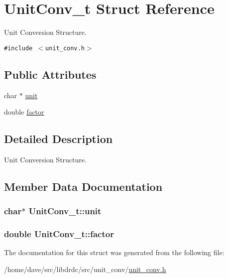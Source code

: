 \hypertarget{structUnitConv__t}{
\section{UnitConv\_\-t Struct Reference}
\label{structUnitConv__t}
}
Unit Conversion Structure.  


{\tt \#include $<$unit\_\-conv.h$>$}

\subsection*{Public Attributes}
\begin{CompactItemize}
\item 
char $\ast$ \hyperlink{structUnitConv__t_d7dea2480635b6ec33a00eada925a162}{unit}
\item 
double \hyperlink{structUnitConv__t_af4fb8026e25994aeea5ab0f48b960da}{factor}
\end{CompactItemize}


\subsection{Detailed Description}
Unit Conversion Structure. 

\subsection{Member Data Documentation}
\hypertarget{structUnitConv__t_d7dea2480635b6ec33a00eada925a162}{
\subsubsection[unit]{\setlength{\rightskip}{0pt plus 5cm}char$\ast$ {\bf UnitConv\_\-t::unit}}}
\label{structUnitConv__t_d7dea2480635b6ec33a00eada925a162}


\hypertarget{structUnitConv__t_af4fb8026e25994aeea5ab0f48b960da}{
\subsubsection[factor]{\setlength{\rightskip}{0pt plus 5cm}double {\bf UnitConv\_\-t::factor}}}
\label{structUnitConv__t_af4fb8026e25994aeea5ab0f48b960da}




The documentation for this struct was generated from the following file:\begin{CompactItemize}
\item 
/home/dave/src/libdrdc/src/unit\_\-conv/\hyperlink{unit__conv_8h}{unit\_\-conv.h}\end{CompactItemize}
